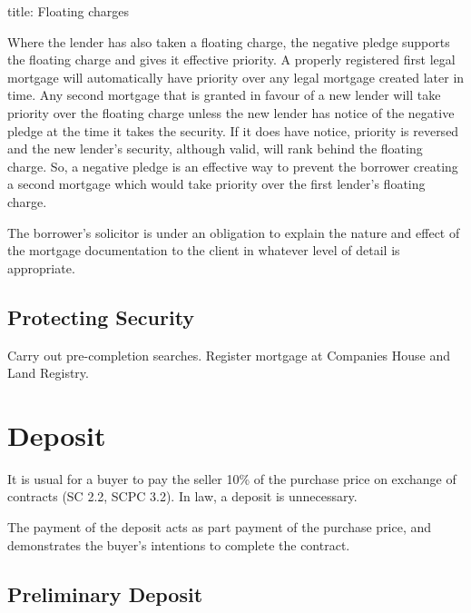 \documentclass[
]{article}
\newenvironment{Shaded}{}{}
\newcommand{\NormalTok}[1]{#1}
\begin{document}
\begin{Shaded}
\begin{Highlighting}[]
\NormalTok{title: Floating charges}

\NormalTok{Where the lender has also taken a floating charge, the negative pledge supports the floating charge and gives it effective priority. A properly registered first legal mortgage will automatically have priority over any legal mortgage created later in time. Any second mortgage that is granted in favour of a new lender will take priority over the floating charge unless the new lender has notice of the negative pledge at the time it takes the security. If it does have notice, priority is reversed and the new lender’s security, although valid, will rank behind the floating charge. So, a negative pledge is an effective way to prevent the borrower creating a second mortgage which would take priority over the first lender’s floating charge.}
\end{Highlighting}
\end{Shaded}

The borrower's solicitor is under an obligation to explain the nature
and effect of the mortgage documentation to the client in whatever level
of detail is appropriate.

\hypertarget{protecting-security}{%
\subsection{Protecting Security}\label{protecting-security}}

Carry out pre-completion searches. Register mortgage at Companies House
and Land Registry.

\hypertarget{deposit-1}{%
\section{Deposit}\label{deposit-1}}

It is usual for a buyer to pay the seller 10\% of the purchase price on
exchange of contracts (SC 2.2, SCPC 3.2). In law, a deposit is
unnecessary.

The payment of the deposit acts as part payment of the purchase price,
and demonstrates the buyer's intentions to complete the contract.

\hypertarget{preliminary-deposit}{%
\subsection{Preliminary Deposit}\label{preliminary-deposit}}
\end{document}
